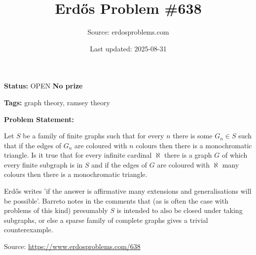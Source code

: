 \documentclass{article}
\title{Erd\H{o}s Problem \#638}
\date{Last updated: 2025-08-31}
\author{Source: erdosproblems.com}
\begin{document}
\maketitle

\noindent\textbf{Status:} OPEN \quad \textbf{No prize}

\noindent\textbf{Tags:} graph theory, ramsey theory

\medskip

\noindent\textbf{Problem Statement:}

Let $S$ be a family of finite graphs such that for every $n$ there is some $G_n\in S$ such that if the edges of $G_n$ are coloured with $n$ colours then there is a monochromatic triangle. Is it true that for every infinite cardinal $\aleph$ there is a graph $G$ of which every finite subgraph is in $S$ and if the edges of $G$ are coloured with $\aleph$ many colours then there is a monochromatic triangle.




Erd\H{o}s writes 'if the answer is affirmative many extensions and generalisations will be possible'. Barreto notes in the comments that (as is often the case with problems of this kind) presumably $S$ is intended to also be closed under taking subgraphs, or else a sparse family of complete graphs gives a trivial counterexample.


\bigskip
\noindent\small{Source: \url{https://www.erdosproblems.com/638}}
\end{document}
